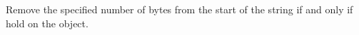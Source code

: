 Remove the specified number of bytes from the start of the string if and only if
 hold on the object.



